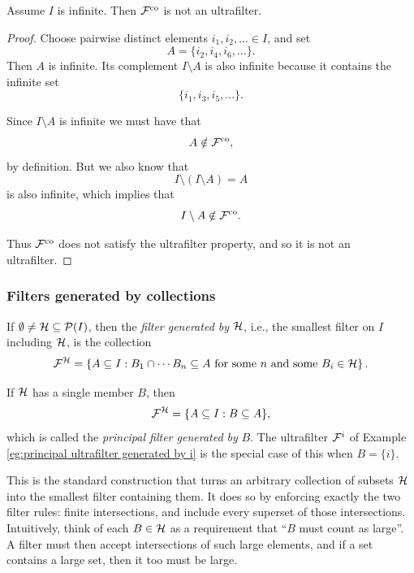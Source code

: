 {\begin{prop}
Assume \(I\) is infinite. Then \(\mathcal{F}^{\mathrm{co}}\) is not an
ultrafilter.
\end{prop}

\begin{proof}
Choose pairwise distinct elements \(i_1, i_2,... \in I\), and set
\[
A=\{i_2, i_4,i_6,...\}.
\]
Then \(A\) is infinite. Its complement \(I \setminus A\) is also infinite
because it contains the infinite set
\[
\{i_1, i_3, i_5,...\}.
\]

Since \(I \setminus A\) is infinite we must have that
\[
A \notin \mathcal{F}^{\mathrm{co}},
\]
by definition. But we also know that
\[
I \setminus (I \setminus A) = A
\]
is also infinite, which implies that
\[
I \setminus A \notin \mathcal{F}^{\mathrm{co}}.
\]

Thus \(\mathcal{F}^{\mathrm{co}}\) does not satisfy the ultrafilter property,
and so it is not an ultrafilter.
\end{proof}

\subsubsection{Filters generated by collections}

\begin{defn}
If \(\emptyset \neq \mathcal{H} \subseteq \mathcal{P}(I)\), then the
\emph{filter generated by} \(\mathcal{H}\), i.e., the smallest filter on \(I\)
including \(\mathcal{H}\), is the collection
\[
\mathcal{F}^{\mathcal{H}}
=
\left\{
A \subseteq I :
B_1 \cap \cdots B_n \subseteq A
\text{ for some } n \text{ and some } B_i \in \mathcal{H}
\right\}.
\]

If \(\mathcal{H}\) has a single member \(B\), then
\[
\mathcal{F}^{\mathcal{H}}
=
\{ A \subseteq I : B \subseteq A \},
\]
which is called the \emph{principal filter generated by} \(B\). The
ultrafilter \(\mathcal{F}^i\) of
Example \ref{eg:principal ultrafilter generated by i} is the special case of
this when \(B=\{i\}\).

This is the standard construction that turns an arbitrary collection of
subsets \(\mathcal{H}\) into the smallest filter containing them. It does so by
enforcing exactly the two filter rules: finite intersections, and include
every superset of those intersections. Intuitively, think of each
\(B \in \mathcal{H}\) as a requirement that ``\(B\) must count as large''. A
filter must then accept intersections of such large elements, and if a set
contains a large set, then it too must be large.
\end{defn}

}
